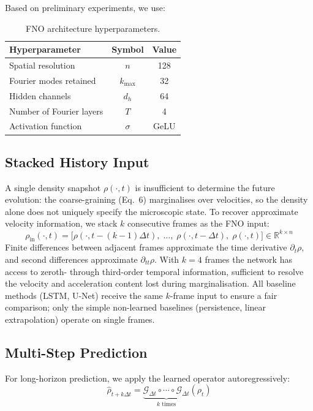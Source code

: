 \documentclass[11pt]{article}
\newcommand{\R}{\mathbb{R}}
\begin{document}
Based on preliminary experiments, we use:
\begin{table}[h]
\centering
\begin{tabular}{lcc}
\toprule
\textbf{Hyperparameter} & \textbf{Symbol} & \textbf{Value} \\
\midrule
Spatial resolution & $n$ & 128 \\
Fourier modes retained & $k_{\max}$ & 32 \\
Hidden channels & $d_h$ & 64 \\
Number of Fourier layers & $T$ & 4 \\
Activation function & $\sigma$ & GeLU \\
\bottomrule
\end{tabular}
\caption{FNO architecture hyperparameters.}
\label{tab:hyperparams}
\end{table}

\subsection{Stacked History Input}

A single density snapshot $\rho(\cdot, t)$ is insufficient to determine the future evolution: the coarse-graining (Eq.~6) marginalises over velocities, so the density alone does not uniquely specify the microscopic state. To recover approximate velocity information, we stack $k$ consecutive frames as the FNO input:
\begin{equation}
    \rho_{\text{in}}(\cdot, t) = \bigl[\rho(\cdot, t-(k{-}1)\Delta t),\; \ldots,\; \rho(\cdot, t{-}\Delta t),\; \rho(\cdot, t)\bigr] \in \R^{k \times n}
\end{equation}
Finite differences between adjacent frames approximate the time derivative $\partial_t \rho$, and second differences approximate $\partial_{tt} \rho$. With $k=4$ frames the network has access to zeroth- through third-order temporal information, sufficient to resolve the velocity and acceleration content lost during marginalisation. All baseline methods (LSTM, U-Net) receive the same $k$-frame input to ensure a fair comparison; only the simple non-learned baselines (persistence, linear extrapolation) operate on single frames.

\subsection{Multi-Step Prediction}

For long-horizon prediction, we apply the learned operator autoregressively:
\begin{equation}
    \hat{\rho}_{t + k\Delta t} = \underbrace{\mathcal{G}_{\Delta t} \circ \cdots \circ \mathcal{G}_{\Delta t}}_{k \text{ times}}(\rho_t)
\end{equation}
\end{document}
